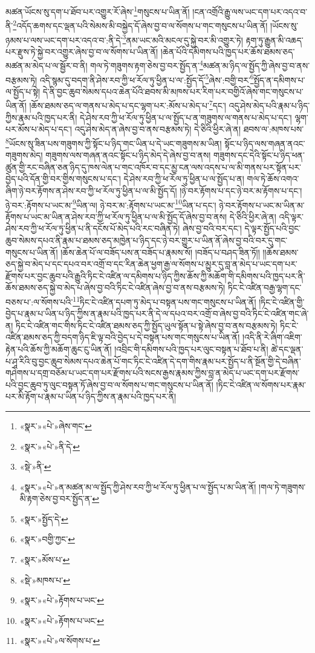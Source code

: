 མཚན་ཡོངས་སུ་དག་པ་ཐོབ་པར་འགྱུར་རོ་ཞེས་\footnote{«སྣར་»«པེ་»ཞེས་གང་}གསུངས་པ་ཡིན་ནོ། །ངན་འགྲོའི་རྒྱུ་ལས་ཡང་དག་པར་འདའ་བ་ནི་\footnote{«སྣར་»«པེ་»ནི་དེ་}འདོད་ཆགས་དང་ལྡན་པའི་སེམས་མི་བསྐྱེད་དོ་ཞེས་བྱ་བ་ལ་སོགས་པ་གང་གསུངས་པ་ཡིན་ནོ། །ཡོངས་སུ་ཉམས་པ་ལས་ཡང་དག་པར་འདའ་བ་:ནི་དེ་\footnote{«སྡེ་»ནི་}ནམ་ཡང་མའི་མངལ་དུ་སྐྱེ་བར་མི་འགྱུར་ཏེ། རྟག་ཏུ་རྒྱུན་མི་འཆད་པར་རྫུས་ཏེ་སྐྱེ་བར་འགྱུར་ཞེས་བྱ་བ་ལ་སོགས་པ་ཡིན་ནོ། །ཆེན་པོའི་དམིགས་པའི་ཁྱད་པར་ཆོས་ཐམས་ཅད་མཚན་མ་མེད་པ་ལ་སྦྱོར་བ་ནི། གལ་ཏེ་གཟུགས་རྟག་ཅེས་བྱ་བར་སྤྱོད་ན་\footnote{«སྣར་»«པེ་»ན་མཚན་མ་ལ་སྤྱོད་ཀྱི་ཤེས་རབ་ཀྱི་ཕ་རོལ་ཏུ་ཕྱིན་པ་ལ་སྤྱོད་པ་མ་ཡིན་ནོ། །གལ་ཏེ་གཟུགས་མི་རྟག་ཅེས་བྱ་བར་སྤྱོད་ན་}མཚན་མ་ཉིད་ལ་སྤྱོད་ཀྱི་ཞེས་བྱ་བ་ནས་བརྩམས་ཏེ། འདི་སྙམ་དུ་བདག་ནི་ཤེས་རབ་ཀྱི་ཕ་རོལ་ཏུ་ཕྱིན་པ་ལ་:སྤྱོད་དོ་\footnote{«སྣར་»སྤྱོད་དེ་}ཞེས་:བགྱི་བར་\footnote{«སྣར་»བགྱི་ཀྱང་}སྤྱོད་ན་དམིགས་པ་ལ་སྤྱོད་པ་སྟེ། དེ་ནི་བྱང་ཆུབ་སེམས་དཔའ་ཆེན་པོའི་ཐབས་མི་མཁས་པར་རིག་པར་བགྱིའོ་ཞེས་གང་གསུངས་པ་ཡིན་ནོ། །ཆོས་ཐམས་ཅད་ལ་གནས་པ་མེད་པ་དང་ལྷག་པར་:མོས་པ་མེད་པ་\footnote{«སྣར་»མོས་པ་}དང་། འདུ་ཤེས་མེད་པའི་རྣམ་པ་ཉིད་ཀྱིས་རྣམ་པའི་ཁྱད་པར་ནི། དེ་ཤེས་རབ་ཀྱི་ཕ་རོལ་ཏུ་ཕྱིན་པ་ལ་སྤྱོད་པ་ན་གཟུགས་ལ་གནས་པ་མེད་པ་དང་། ལྷག་པར་མོས་པ་མེད་པ་དང་། འདུ་ཤེས་མེད་ན་ཞེས་བྱ་བ་ནས་བརྩམས་ཏེ། དེ་ཅིའི་ཕྱིར་ཞེ་ན། ཐབས་ལ་:མཁས་པས་\footnote{«སྡེ་»མཁས་པ་}ཡོངས་སུ་ཟིན་པས་གཟུགས་ཀྱི་སྟོང་པ་ཉིད་གང་ཡིན་པ་དེ་ཡང་གཟུགས་མ་ཡིན། སྟོང་པ་ཉིད་ལས་གཞན་ནའང་གཟུགས་མེད། གཟུགས་ལས་གཞན་ནའང་སྟོང་པ་ཉིད་མེད་དེ་ཞེས་བྱ་བ་ནས། གཟུགས་དང་དེའི་སྟོང་པ་ཉིད་ཕན་ཚུན་གྱི་རང་བཞིན་ཅན་ཉིད་དུ་ཁས་ལེན་པ་གང་འཁོར་བ་དང་མྱ་ངན་ལས་འདས་པ་ལ་མི་གནས་པར་སྟོན་པར་བྱེད་པའི་དོན་གྱི་བར་གྱིས་གསུངས་པ་དང་། དེ་ཤེས་རབ་ཀྱི་ཕ་རོལ་ཏུ་ཕྱིན་པ་ལ་སྤྱོད་པ་ན། གལ་ཏེ་ཆོས་འགའ་ཞིག་ཉེ་བར་རྟོགས་ན་ཤེས་རབ་ཀྱི་ཕ་རོལ་ཏུ་ཕྱིན་པ་ལ་མི་སྤྱོད་དོ། །ཉེ་བར་རྟོགས་པ་དང་ཉེ་བར་མ་རྟོགས་པ་དང་། ཉེ་བར་:རྟོགས་པ་ཡང་མ་\footnote{«སྣར་»«པེ་»རྟོགས་པ་ཡང་}ཡིན་ལ། ཉེ་བར་མ་:རྟོགས་པ་ཡང་མ་\footnote{«སྣར་»«པེ་»རྟོགས་པ་ཡང་}ཡིན་པ་དང་། ཉེ་བར་རྟོགས་པ་ཡང་མ་ཡིན་མ་རྟོགས་པ་ཡང་མ་ཡིན་ན་ཤེས་རབ་ཀྱི་ཕ་རོལ་ཏུ་ཕྱིན་པ་ལ་མི་སྤྱོད་དོ་ཞེས་བྱ་བ་ནས། དེ་ཅིའི་ཕྱིར་ཞེ་ན། འདི་ལྟར་ཤེས་རབ་ཀྱི་ཕ་རོལ་ཏུ་ཕྱིན་པ་ནི་དངོས་པོ་མེད་པའི་རང་བཞིན་ཏེ། ཞེས་བྱ་བའི་བར་དང་། དེ་ལྟར་སྤྱོད་པའི་བྱང་ཆུབ་སེམས་དཔའ་ནི་རྣམ་པ་ཐམས་ཅད་མཁྱེན་པ་ཉིད་དང་ཉེ་བར་གྱུར་པ་ཡིན་ནོ་ཞེས་བྱ་བའི་བར་དུ་གང་གསུངས་པ་ཡིན་ནོ། །ཆོས་ཆེན་པོ་ལ་བཟོད་པས་ན་བཟོད་པ་རྣམས་སོ། །བཟོད་པ་བཤད་ཟིན་ཏོ།། །།ཆོས་ཐམས་ཅད་སྐྱེ་བ་མེད་པ་དང་དཔའ་བར་འགྲོ་བ་དང་རིན་ཆེན་ཕྱག་རྒྱ་ལ་སོགས་པ་མྱུར་དུ་བླ་ན་མེད་པ་ཡང་དག་པར་རྫོགས་པར་བྱང་ཆུབ་པའི་རྒྱུའི་ཏིང་ངེ་འཛིན་ལ་དམིགས་པ་ཉིད་ཀྱིས་ཆོས་ཀྱི་མཆོག་གི་དམིགས་པའི་ཁྱད་པར་ནི་ཆོས་ཐམས་ཅད་སྐྱེ་བ་མེད་པ་ཞེས་བྱ་བའི་ཏིང་ངེ་འཛིན་ཞེས་བྱ་བ་ནས་བརྩམས་ཏེ། ཏིང་ངེ་འཛིན་བརྒྱ་ལྷག་དང་བཅས་པ་:ལ་སོགས་པའི་\footnote{«སྣར་»«པེ་»ལ་སོགས་པ་}ཏིང་ངེ་འཛིན་དཔག་ཏུ་མེད་པ་བསྟན་པས་གང་གསུངས་པ་ཡིན་ནོ། །ཏིང་ངེ་འཛིན་གྱི་བྱེད་པ་རྣམ་པ་ཡིན་པ་ཉིད་ཀྱིས་ན་རྣམ་པའི་ཁྱད་པར་ནི་དེ་ལ་དཔའ་བར་འགྲོ་བ་ཞེས་བྱ་བའི་ཏིང་ངེ་འཛིན་གང་ཞེ་ན། ཏིང་ངེ་འཛིན་གང་གིས་ཏིང་ངེ་འཛིན་ཐམས་ཅད་ཀྱི་སྤྱོད་ཡུལ་སྟོན་པ་སྟེ་ཞེས་བྱ་བ་ནས་བརྩམས་ཏེ། ཏིང་ངེ་འཛིན་ཐམས་ཅད་ཀྱི་བདག་ཉིད་ཇི་ལྟ་བའི་བྱེད་པ་དེ་བསྟན་པས་གང་གསུངས་པ་ཡིན་ནོ། །འདི་ནི་རེ་ཞིག་འཇིག་རྟེན་པའི་ཆོས་ཀྱི་མཆོག་ཆུང་ངུ་ཡིན་ནོ། །འབྲིང་གི་དམིགས་པའི་ཁྱད་པར་ལུང་བསྟན་པ་ཐོབ་པ་ནི། ཚེ་དང་ལྡན་པ་ཤཱ་རིའི་བུ་བྱང་ཆུབ་སེམས་དཔའ་ཆེན་པོ་གང་ཏིང་ངེ་འཛིན་དེ་དག་གིས་རྣམ་པར་སྤྱོད་པ་ནི་སྔོན་གྱི་དེ་བཞིན་གཤེགས་པ་དགྲ་བཅོམ་པ་ཡང་དག་པར་རྫོགས་པའི་སངས་རྒྱས་རྣམས་ཀྱིས་བླ་ན་མེད་པ་ཡང་དག་པར་རྫོགས་པའི་བྱང་ཆུབ་ཏུ་ལུང་བསྟན་ཏོ་ཞེས་བྱ་བ་ལ་སོགས་པ་གང་གསུངས་པ་ཡིན་ནོ། །ཏིང་ངེ་འཛིན་ལ་སོགས་པར་རྣམ་པར་མི་རྟོག་པ་རྣམ་པ་ཡིན་པ་ཉིད་ཀྱིས་ན་རྣམ་པའི་ཁྱད་པར་ནི། 